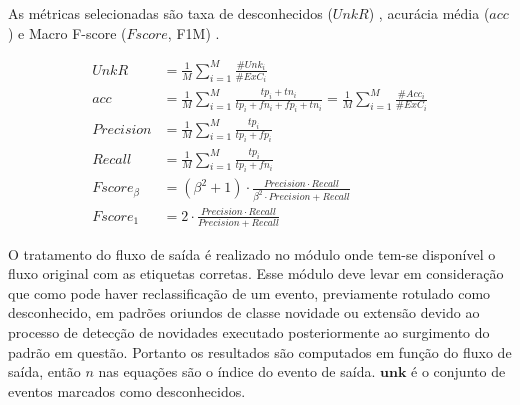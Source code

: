 As métricas selecionadas são taxa de desconhecidos ($UnkR$) \cite{Faria2013},
acurácia média ($acc$) e Macro F-score ($Fscore$, F1M)
\cite{Sokolova2009,DaSilva2018thesis}.



\begin{align}
  \mathit{UnkR}       &= \frac{1}{M} \sum_{i=1}^{M} \frac{\#Unk_i}{\#ExC_i}\\
  \mathit{acc}        &= \frac{1}{M} \sum_{i=1}^{M} \frac{tp_i + tn_i}{tp_i+fn_i+fp_i+tn_i}
  = \frac{1}{M} \sum_{i=1}^{M} \frac{\#Acc_i}{\#ExC_i}\\
  \mathit{Precision}  &= \frac{1}{M} \sum_{i=1}^{M} \frac{tp_i}{tp_i+fp_i} \\
  \mathit{Recall}     &= \frac{1}{M} \sum_{i=1}^{M} \frac{tp_i}{tp_i+fn_i} \\
  \mathit{Fscore}_\beta &= (\beta^2 +1) \cdot
  \frac{
  \mathit{Precision} \cdot \mathit{Recall}
  }{
    \beta^2 \cdot \mathit{Precision} +\mathit{Recall}
  }\\
  \mathit{Fscore}_1   &= 2 \cdot \frac{
    \mathit{Precision} \cdot \mathit{Recall}
    }{
      \mathit{Precision} +\mathit{Recall}
    } 
\end{align}

O tratamento do fluxo de saída é realizado no módulo \sink onde tem-se
disponível o fluxo original com as etiquetas corretas.
Esse módulo deve levar em consideração que
como pode haver reclassificação de um evento, previamente rotulado como
desconhecido, em padrões oriundos de classe novidade ou extensão devido ao
processo de detecção de novidades executado posteriormente ao surgimento
do padrão em questão.
Portanto os resultados são computados em função do fluxo de saída, então $n$ nas
equações são o índice do evento de saída.
$\mathbf{unk}$ é o conjunto de eventos marcados como desconhecidos.

